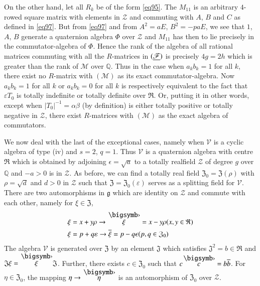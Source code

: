 On the other hand, let all $R_{k}$ be of the form \eqref{eq95}. The
$M_{11}$ is an arbitrary $4$-rowed square matrix with elements in
$\mathscr{Z}$ and commuting with $A$, $B$ and $C$ as defined in
\eqref{eq97}. But from \eqref{eq97} and from $A^{2}=aE$, $B^{2}=-paE$, we
see that $1$, $A$, $B$ generate a quaternion algebra $\Phi$ over
$\mathscr{Z}$ and $M_{11}$ has then to lie precisely in the
commutator-algebra of $\Phi$. Hence the rank of the algebra of all
rational matrices commuting with all the $R$-matrices in
$(\underline{\mathscr{F}})$ is precisely $4g=2h$ which is greater than the
rank of $\mathscr{M}$ over $\mathbb{Q}$. Thus in the case when
$a_{k}b_{k}=1$ for all $k$, there exist no $R$-matrix with
$(\mathscr{M})$ as its exact commutator-algebra. Now $a_{k}b_{k}=1$
for all $k$ or $a_{k}b_{k}=0$ for all $k$ is respectively equivalent
to the fact that $\varepsilon T_{0}$ is totally indefinite or totally
definite over $\mathfrak{R}$. Or, putting it in other words, except
when $|T_{0}|^{-1}=\alpha\beta$ (by definition) is either totally
positive or totally negative in $\mathscr{Z}$, there exist
$R$-matrices with $(\mathscr{M})$ as the exact algebra of commutators.

We now deal with the last of the exceptional cases, namely when
$\mathscr{V}$ is a cyclic algebra of type (iv) and $s=2$, $q=1$. Thus
$\mathscr{V}$ is a quaternion algebra with centre $\mathfrak{R}$ which
is obtained by adjoining $\epsilon=\sqrt{a}$ to a totally
real\pageoriginale field $\mathscr{Z}$ of degree $g$ over $\mathbb{Q}$
and $-a>0$ is in $\mathscr{Z}$. As before, we can find a totally real
field $\mathfrak{Z}_{0}=\mathfrak{Z} (\rho)$ with $\rho = \sqrt{d}$
and $d>0$ in $\mathscr{Z}$ such that $\mathfrak{Z} = \mathfrak{Z}_0
(\varepsilon)$ serves as a 
splitting field for $\mathscr{V}$. There are two automorphisms in
$\mathfrak{g}$ which are identity on $\mathscr{Z}$ and commute with
each other, namely for $\xi\in\mathfrak{Z}$,
\begin{align*}
\xi &= x+y\rho\to \overdot{\xi}=x-y\rho (x,y\in\mathfrak{R})\\
\xi &= p+q\varepsilon \to \ob{\xi}=p-q\epsilon (p,q\in\mathfrak{Z}_{0})
\end{align*}
The algebra $\mathscr{V}$ is generated over $\mathfrak{Z}$ by an
element $\mathfrak{J}$ which satisfies
$\mathfrak{J}^{2}=b\in\mathfrak{R}$ and
$\mathfrak{J}\xi=\overdot{\xi}\mathfrak{J}$. Further, there exists
$c\in \mathfrak{Z}_{0}$ such that $c\overdot{c}=b\ob{b}$. For
$\eta\in\mathfrak{Z}_{0}$, the mapping $\eta\to \overdot{\eta}$ is an
automorphism of $\mathfrak{Z}_{0}$ over $\mathscr{Z}$.

